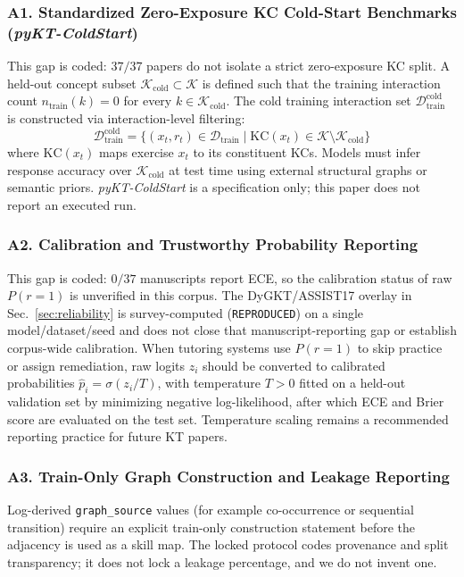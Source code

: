 \documentclass[lettersize,journal]{IEEEtran}
\begin{document}
\subsubsection{A1. Standardized Zero-Exposure KC Cold-Start Benchmarks (\emph{pyKT-ColdStart})}
This gap is coded: $37/37$ papers do not isolate a strict zero-exposure KC split. A held-out concept subset $\mathcal{K}_{\text{cold}} \subset \mathcal{K}$ is defined such that the training interaction count $n_{\text{train}}(k) = 0$ for every $k \in \mathcal{K}_{\text{cold}}$. The cold training interaction set $\mathcal{D}_{\text{train}}^{\text{cold}}$ is constructed via interaction-level filtering:
\begin{equation}
\mathcal{D}_{\text{train}}^{\text{cold}} = \{(x_t, r_t) \in \mathcal{D}_{\text{train}} \mid \text{KC}(x_t) \in \mathcal{K} \setminus \mathcal{K}_{\mathrm{cold}}\}
\end{equation}
where $\text{KC}(x_t)$ maps exercise $x_t$ to its constituent KCs. Models must infer response accuracy over $\mathcal{K}_{\text{cold}}$ at test time using external structural graphs or semantic priors. \emph{pyKT-ColdStart} is a specification only; this paper does not report an executed run.

\subsubsection{A2. Calibration and Trustworthy Probability Reporting}
This gap is coded: $0/37$ manuscripts report ECE, so the calibration status of raw $P(r=1)$ is unverified in this corpus. The DyGKT/ASSIST17 overlay in Sec.~\ref{sec:reliability} is survey-computed (\texttt{REPRODUCED}) on a single model/dataset/seed and does not close that manuscript-reporting gap or establish corpus-wide calibration. When tutoring systems use $P(r=1)$ to skip practice or assign remediation, raw logits $z_i$ should be converted to calibrated probabilities $\hat{p}_i = \sigma(z_i/T)$, with temperature $T>0$ fitted on a held-out validation set by minimizing negative log-likelihood, after which ECE and Brier score are evaluated on the test set. Temperature scaling remains a recommended reporting practice for future KT papers.

\subsubsection{A3. Train-Only Graph Construction and Leakage Reporting}
Log-derived \texttt{graph\_source} values (for example co-occurrence or sequential transition) require an explicit train-only construction statement before the adjacency is used as a skill map. The locked protocol codes provenance and split transparency; it does not lock a leakage percentage, and we do not invent one.
\end{document}
